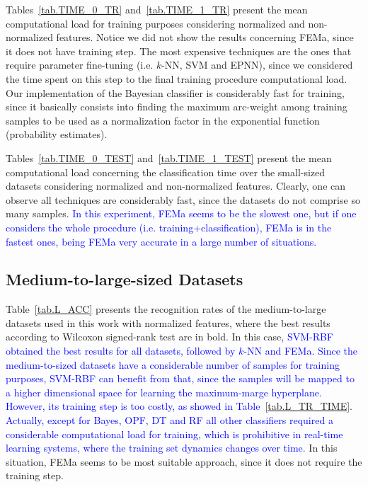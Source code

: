 





Tables~\ref{tab.TIME_0_TR} and~\ref{tab.TIME_1_TR} present the mean computational load for training purposes considering normalized and non-normalized features. Notice we did not show the results concerning FEMa, since it does not have training step. The most expensive techniques are the ones that require parameter fine-tuning (i.e. $k$-NN, SVM and EPNN), since we considered the time spent on this step to the final training procedure computational load. Our implementation of the Bayesian classifier is considerably fast for training, since it basically consists into finding the maximum arc-weight among training samples to be used as a normalization factor in the exponential function (probability estimates).





Tables~\ref{tab.TIME_0_TEST} and~\ref{tab.TIME_1_TEST} present the mean computational load concerning the classification time over the small-sized datasets considering normalized and non-normalized features. Clearly, one can observe all techniques are considerably fast, since the datasets do not comprise so many samples. \textcolor{blue}{In this experiment, FEMa seems to be the slowest one, but if one considers the whole procedure (i.e. training+classification), FEMa is in the fastest ones, being FEMa very accurate in a large number of situations.}


\subsection{Medium-to-large-sized Datasets}
\label{ss.medium_to_large}

Table~\ref{tab.L_ACC} presents the recognition rates of the medium-to-large datasets used in this work with normalized features, where the best results according to Wilcoxon signed-rank test are in bold. In this case, \textcolor{blue}{SVM-RBF obtained the best results for all datasets, followed by $k$-NN and FEMa. Since the medium-to-sized datasets have a considerable number of samples for training purposes, SVM-RBF can benefit from that, since the samples will be mapped to a higher dimensional space for learning the maximum-marge hyperplane. However, its training step is too costly, as showed in Table~\ref{tab.L_TR_TIME}}. \textcolor{blue}{Actually, except for Bayes, OPF, DT and RF all other classifiers required a considerable computational load for training, which is prohibitive in real-time learning systems, where the training set dynamics changes over time.} In this situation, FEMa seems to be most suitable approach, since it does not require the training step.


